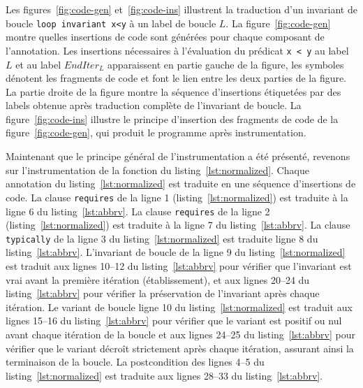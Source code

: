 Les figures~\ref{fig:code-gen} et~\ref{fig:code-ins} illustrent la traduction
d'un invariant de boucle \lstinline'loop invariant x<y' à un label de boucle
$L$.
La figure~\ref{fig:code-gen} montre quelles insertions de code sont générées
pour chaque composant de l'annotation.
Les insertions nécessaires à l'évaluation du prédicat \lstinline'x < y' au
label $L$ et au label $EndIter_L$ apparaissent en partie gauche de la figure,
les symboles  dénotent les
fragments de code et font le lien entre les deux parties de la figure.
La partie droite de la figure montre la séquence d'insertions étiquetées par
des labels obtenue après traduction complète de l'invariant de boucle.
La figure~\ref{fig:code-ins} illustre le principe d'insertion des fragments de
code de la figure~\ref{fig:code-gen}, qui produit le programme après
instrumentation.


Maintenant que le principe général de l'instrumentation a été présenté, revenons
sur l'instrumentation de la fonction du listing~\ref{lst:normalized}.
Chaque annotation du listing~\ref{lst:normalized} est traduite en une séquence
d'insertions de code.
La clause \lstinline'requires' de la ligne 1 (listing~\ref{lst:normalized}) est
traduite à la ligne 6 du listing~\ref{lst:abbrv}.
La clause \lstinline'requires' de la ligne 2 (listing~\ref{lst:normalized}) est
traduite à la ligne 7 du listing~\ref{lst:abbrv}.
La clause \lstinline'typically' de la ligne 3 du listing~\ref{lst:normalized}
est traduite ligne 8 du listing~\ref{lst:abbrv}.
L'invariant de boucle de la ligne 9 du listing~\ref{lst:normalized} est traduit
aux lignes 10--12 du listing~\ref{lst:abbrv} pour vérifier que l'invariant est
vrai avant la première itération (établissement), et aux lignes 20--24 du
listing~\ref{lst:abbrv} pour vérifier la préservation de l'invariant après
chaque itération.
Le variant de boucle ligne 10 du listing~\ref{lst:normalized} est traduit aux
lignes 15--16 du listing~\ref{lst:abbrv} pour vérifier que le variant est
positif ou nul avant chaque itération de la boucle et aux lignes 24--25 du
listing~\ref{lst:abbrv} pour vérifier que le
variant décroît strictement après chaque itération, assurant ainsi la
terminaison de la boucle.
La postcondition des lignes 4--5 du listing~\ref{lst:normalized} est traduite
aux lignes 28--33 du listing~\ref{lst:abbrv}.

